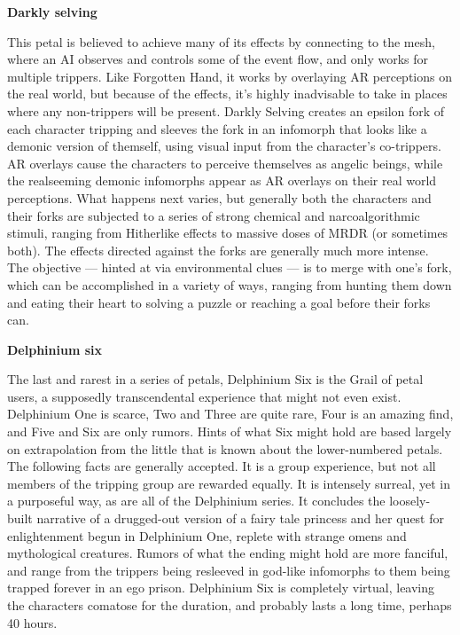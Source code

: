 \textbf{Darkly selving} 

This petal is believed to achieve many of its effects by connecting to the mesh, where an AI observes and controls some of the event flow, and only works for multiple trippers. Like Forgotten Hand, it works by overlaying AR perceptions on the real world, but because of the effects, it’s highly inadvisable to take in places where any non-trippers will be present. Darkly Selving creates an epsilon fork of each character tripping and sleeves the fork in an infomorph that looks like a demonic version of themself, using visual input from the character’s co-trippers. AR overlays cause the characters to perceive themselves as angelic beings, while the realseeming demonic infomorphs appear as AR overlays on their real world perceptions. What happens next varies, but generally both the characters and their forks are subjected to a series of strong chemical and narcoalgorithmic stimuli, ranging from Hitherlike effects to massive doses of MRDR (or sometimes both). The effects directed against the forks are generally much more intense. The objective --- hinted at via environmental clues --- is to merge with one’s fork, which can be accomplished in a variety of ways, ranging from hunting them down and eating their heart to solving a puzzle or reaching a goal before their forks can. 

\textbf{Delphinium six} 

The last and rarest in a series of petals, Delphinium Six is the Grail of petal users, a supposedly transcendental experience that might not even exist. Delphinium One is scarce, Two and Three are quite rare, Four is an amazing find, and Five and Six are only rumors. Hints of what Six might hold are based largely on extrapolation from the little that is known about the lower-numbered petals. The following facts are generally accepted. It is a group experience, but not all members of the tripping group are rewarded equally. It is intensely surreal, yet in a purposeful way, as are all of the Delphinium series. It concludes the loosely-built narrative of a drugged-out version of a fairy tale princess and her quest for enlightenment begun in Delphinium One, replete with strange omens and mythological creatures. Rumors of what the ending might hold are more fanciful, and range from the trippers being resleeved in god-like infomorphs to them being trapped forever in an ego prison. Delphinium Six is completely virtual, leaving the characters comatose for the duration, and probably lasts a long time, perhaps 40 hours. 

